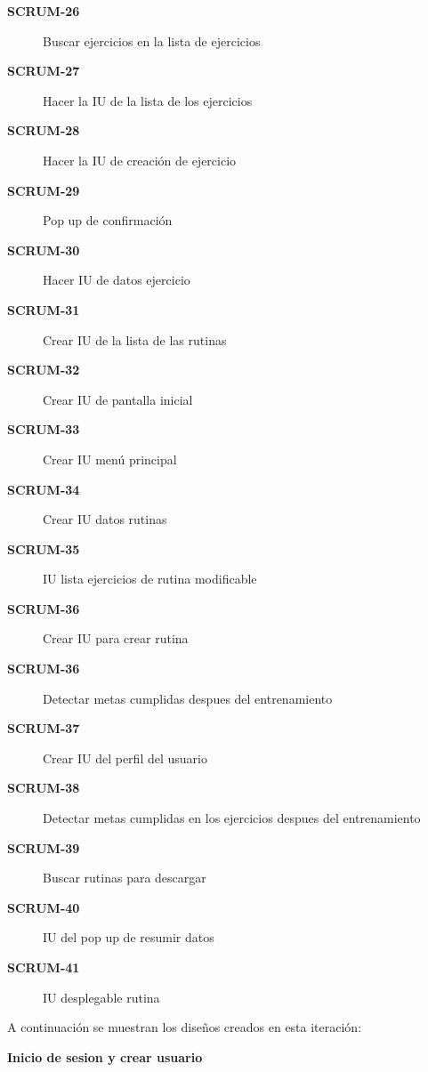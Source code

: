 \begin{description}
  \item[\textbf{SCRUM-26}] Buscar ejercicios en la lista de ejercicios
  \item[\textbf{SCRUM-27}] Hacer la IU de la lista de los ejercicios
  \item[\textbf{SCRUM-28}] Hacer la IU de creación de ejercicio
  \item[\textbf{SCRUM-29}] Pop up de confirmación
  \item[\textbf{SCRUM-30}] Hacer IU de datos ejercicio
  \item[\textbf{SCRUM-31}] Crear IU de la lista de las rutinas
  \item[\textbf{SCRUM-32}] Crear IU de pantalla inicial
  \item[\textbf{SCRUM-33}] Crear IU menú principal
  \item[\textbf{SCRUM-34}] Crear IU datos rutinas
  \item[\textbf{SCRUM-35}] IU lista ejercicios de rutina modificable
  \item[\textbf{SCRUM-36}] Crear IU para crear rutina
  \item[\textbf{SCRUM-36}] Detectar metas cumplidas despues del entrenamiento
  \item[\textbf{SCRUM-37}] Crear IU del perfil del usuario
  \item[\textbf{SCRUM-38}] Detectar metas cumplidas en los ejercicios despues del entrenamiento
  \item[\textbf{SCRUM-39}] Buscar rutinas para descargar
  \item[\textbf{SCRUM-40}] IU del pop up de resumir datos
  \item[\textbf{SCRUM-41}] IU desplegable rutina
  
\end{description}

A continuación se muestran los diseños creados en esta iteración:

\textbf{Inicio de sesion y crear usuario}

